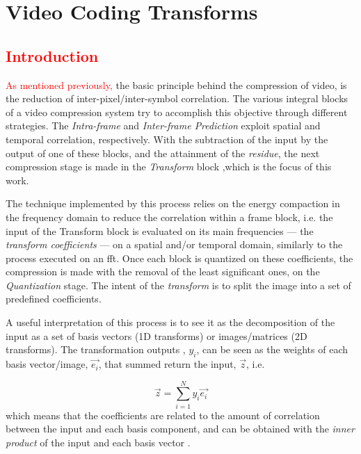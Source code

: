 \cleardoublepage
\chapter{Video Coding Transforms}

\section{\textcolor{red}{Introduction}}

\textcolor{red}{As mentioned previously,} the basic principle behind the compression of video, is the reduction of inter-pixel/inter-symbol correlation. The various integral blocks of a video compression system try to accomplish this objective through different strategies. The \emph{Intra-frame} and \emph{Inter-frame Prediction} exploit spatial and temporal correlation, respectively. With the subtraction of the input by the output of one of these blocks, and the attainment of the \emph{residue}, the next compression stage is made in the \emph{Transform} block
,which is the focus of this work.


The technique implemented by this process relies on the energy compaction in the frequency domain to reduce the correlation within a frame block, i.e. the input of the Transform block is evaluated on its main frequencies --- the \emph{transform coefficients} --- on a spatial and/or temporal domain, similarly to the process executed on an \gls{fft}. Once each block is quantized on these coefficients, the compression is made with the removal of the least significant ones, on the \emph{Quantization} stage. The intent of the \emph{transform} is to split the image into a set of predefined coefficients.

A useful interpretation of this process is to see it as the decomposition of the input as a set of basis vectors (1D transforms) or images/matrices (2D transforms). The transformation outputs , $y_i$, can be seen as the weights of each basis vector/image, $\vec{e_i}$, that summed return the input, $\vec{z}$, i.e.

\begin{equation}
    \vec{z} = \sum_{i=1}^{N} y_i \vec{e_i}
\end{equation}
which means that the coefficients are related to the amount of correlation between the input and each basis component, and can be obtained with the \emph{inner product} of the input and each basis vector %
.


